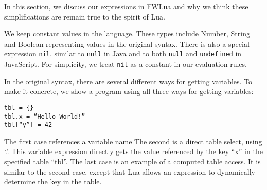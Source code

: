 In this section, we discuss our expressions in FWLua and why we think these simplifications are
remain true to the spirit of Lua.

We keep constant values in the language.
These types include Number, String and Boolean representing values in the original syntax.
%
There is also a special expression {\tt nil}, similar to {\tt null} in Java and to both {\tt null} and {\tt undefined} in JavaScript.
For simplicity, we treat {\tt nil} as a constant in our evaluation rules.

In the original syntax,
there are several different ways for getting variables.
To make it concrete, we show a program using all three ways for getting variables:

\begin{flushleft}
\tt tbl = \{\}\\
\tt tbl.x = ``Hello World!''\\
\tt tbl[``y''] = 42\\
\end{flushleft}

The first case references a variable name
The second is a direct table select, using `.'.
This variable expression directly gets the value referenced by the key ``x'' in the specified table ``tbl''.
The last case is an example of a computed table access.
It is similar to the second case, except that Lua allows an expression to dynamically determine the key in the table.

